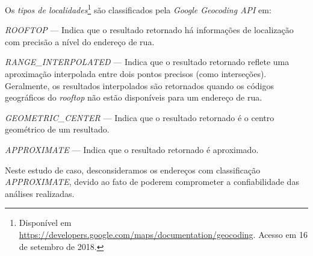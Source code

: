 \documentclass[
	12pt,				%
	oneside,			%
	a4paper,			%
	english,			%
	brazil				%
	]{abntex2ppgsi}
\begin{document}
{{{Os \textit{tipos de localidades}\footnote{Disponível em \url{https://developers.google.com/maps/documentation/geocoding}. Acesso em 16 de setembro de 2018.} são classificados pela \textit{Google Geocoding API} em:
\begin{enumerate*}
\item \textit{ROOFTOP} --- Indica que o resultado retornado há informações de localização com precisão a nível do endereço de rua.
\item \textit{RANGE\_INTERPOLATED} --- Indica que o resultado retornado reflete uma aproximação interpolada entre dois pontos precisos (como interseções). Geralmente, os resultados interpolados são retornados quando os códigos geográficos do \textit{rooftop} não estão disponíveis para um endereço de rua.
\item \textit{GEOMETRIC\_CENTER} --- Indica que o resultado retornado é o centro geométrico de um resultado.
\item \textit{APPROXIMATE} --- Indica que o resultado retornado é aproximado.
\end{enumerate*}

Neste estudo de caso, desconsideramos os endereços com classificação \textit{APPROXIMATE}, devido ao fato de poderem comprometer a confiabilidade das análises realizadas. 

}}}
\end{document}

